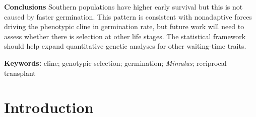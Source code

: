 \documentclass[
  12pt,
]{article}
\begin{document}
\textbf{Conclusions} Southern populations have higher early survival but this is not caused by faster germination. This pattern is consistent with nonadaptive forces driving the phenotypic cline in germination rate, but future work will need to assess whether there is selection at other life stages. The statistical framework should help expand quantitative genetic analyses for other waiting-time traits.

\textbf{Keywords:} cline; genotypic selection; germination; \emph{Mimulus}; reciprocal transplant

\newpage

\hypertarget{introduction}{%
\section{Introduction}\label{introduction}}
\end{document}
